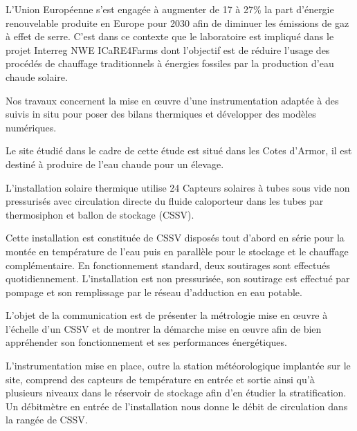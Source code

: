{\normalsize
L'Union Européenne s'est engagée à augmenter de 17 à 27\% la part d'énergie renouvelable produite en Europe pour 2030 afin de diminuer les émissions de gaz à effet de serre. C'est dans ce contexte que le laboratoire est impliqué dans le projet Interreg NWE ICaRE4Farms dont l'objectif est de réduire l'usage des procédés de chauffage traditionnels à énergies fossiles par la production d'eau chaude solaire. 







Nos travaux concernent la mise en œuvre d'une instrumentation adaptée à des suivis in situ pour poser des bilans thermiques et développer des modèles numériques. 







Le site étudié dans le cadre de cette étude est situé dans les Cotes d'Armor, il est destiné à produire de l'eau chaude pour un élevage. 







L'installation solaire thermique utilise 24 Capteurs solaires à tubes sous vide non pressurisés avec circulation directe du fluide caloporteur dans les tubes par thermosiphon et ballon de stockage (CSSV).







Cette installation est constituée de CSSV disposés tout d'abord en série pour la montée en température de l'eau puis en parallèle pour le stockage et le chauffage complémentaire. En fonctionnement standard, deux soutirages sont effectués quotidiennement. L'installation est non pressurisée, son soutirage est effectué par pompage et son remplissage par le réseau d'adduction en eau potable.







L'objet de la communication est de présenter la métrologie mise en œuvre à l'échelle d'un CSSV et de montrer la démarche mise en œuvre afin de bien appréhender son fonctionnement et ses performances énergétiques.







L'instrumentation mise en place, outre la station météorologique implantée sur le site, comprend des capteurs de température en entrée et sortie ainsi qu'à plusieurs niveaux dans le réservoir de stockage afin d'en étudier la stratification. Un débitmètre en entrée de l'installation nous donne le débit de circulation dans la rangée de CSSV.







}
